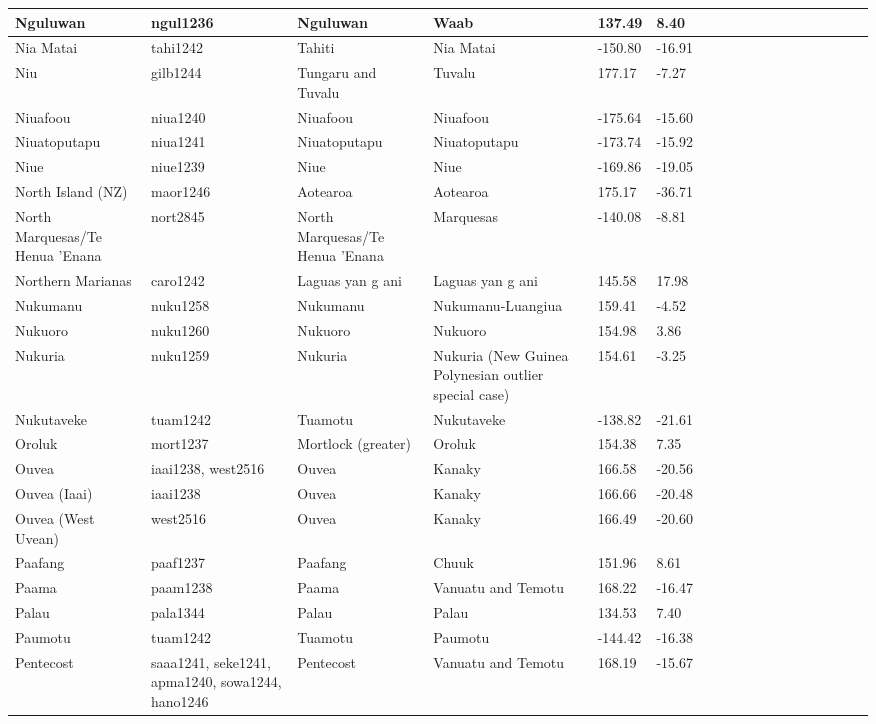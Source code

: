 \documentclass[a4paper,10pt]{article} %
\begin{document}
\begin{landscape}
\begin{longtable}{| p{2.5cm} |  p{7cm} | p{2.5cm}  | p{2.5cm}  | p{2.5cm}  | p{2.5cm}  | p{2.5cm}  | p{2cm}  | p{1cm} | p{1cm}  | p{1cm} | p{1cm}  | p{1.5cm}  | p{1cm} | p{1cm}  | p{1cm}  |p{1cm}  | p{1cm}    |}
 Nguluwan & ngul1236 & Nguluwan & Waab & 137.49 & 8.40 \\ \hline
 Nia Matai & tahi1242 & Tahiti & Nia Matai & -150.80 & -16.91 \\ \hline
 Niu & gilb1244 & Tungaru and Tuvalu & Tuvalu & 177.17 & -7.27 \\ \hline
 Niuafoou & niua1240 & Niuafoou & Niuafoou & -175.64 & -15.60 \\ \hline
 Niuatoputapu & niua1241 & Niuatoputapu & Niuatoputapu & -173.74 & -15.92 \\ \hline
 Niue & niue1239 & Niue & Niue & -169.86 & -19.05 \\ \hline
 North Island (NZ) & maor1246 & Aotearoa & Aotearoa & 175.17 & -36.71 \\ \hline
 North Marquesas/Te Henua 'Enana & nort2845 & North Marquesas/Te Henua 'Enana & Marquesas & -140.08 & -8.81 \\ \hline
 Northern Marianas & caro1242 & Laguas yan g ani & Laguas yan g ani & 145.58 & 17.98 \\ \hline
 Nukumanu & nuku1258 & Nukumanu & Nukumanu-Luangiua & 159.41 & -4.52 \\ \hline
 Nukuoro & nuku1260 & Nukuoro & Nukuoro & 154.98 & 3.86 \\ \hline
 Nukuria & nuku1259 & Nukuria & Nukuria (New Guinea Polynesian outlier special case) & 154.61 & -3.25 \\ \hline
 Nukutaveke & tuam1242 & Tuamotu & Nukutaveke & -138.82 & -21.61 \\ \hline
 Oroluk & mort1237 & Mortlock (greater) & Oroluk & 154.38 & 7.35 \\ \hline
 Ouvea & iaai1238,  west2516 & Ouvea & Kanaky & 166.58 & -20.56 \\ \hline
 Ouvea (Iaai) & iaai1238 & Ouvea & Kanaky & 166.66 & -20.48 \\ \hline
 Ouvea (West Uvean) & west2516 & Ouvea & Kanaky & 166.49 & -20.60 \\ \hline
 Paafang & paaf1237 & Paafang & Chuuk & 151.96 & 8.61 \\ \hline
 Paama & paam1238 & Paama & Vanuatu and Temotu & 168.22 & -16.47 \\ \hline
 Palau & pala1344 & Palau & Palau & 134.53 & 7.40 \\ \hline
 Paumotu & tuam1242  & Tuamotu & Paumotu & -144.42 & -16.38 \\ \hline
 Pentecost & saaa1241, seke1241, apma1240, sowa1244, hano1246 & Pentecost & Vanuatu and Temotu & 168.19 & -15.67 \\ \hline

\end{longtable}
\end{landscape}
\end{document}
